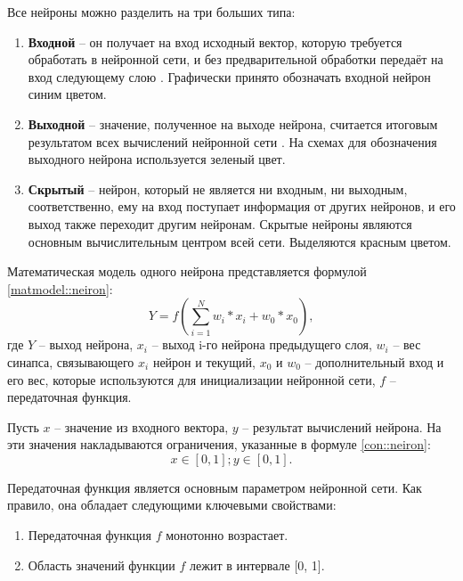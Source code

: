 Все нейроны можно разделить на три больших типа:
\begin{enumerate}
	\item \textbf{Входной} -- он получает на вход исходный вектор, которую требуется обработать в нейронной сети, и без предварительной обработки передаёт на вход следующему слою \cite{ridnet}.
	Графически принято обозначать входной нейрон синим цветом.
	\item \textbf{Выходной} -- значение, полученное на выходе нейрона, считается итоговым результатом всех вычислений нейронной сети \cite{ridnet}.
	На схемах для обозначения выходного нейрона используется зеленый цвет.
	\item \textbf{Скрытый} -- нейрон, который не является ни входным, ни выходным, соответственно, ему на вход поступает информация от других нейронов, и его выход также переходит другим нейронам.
	Скрытые нейроны являются основным вычислительным центром всей сети.
	Выделяются красным цветом.
\end{enumerate}

Математическая модель одного нейрона представляется формулой \ref{matmodel::neiron}:
\begin{equation}
	\label{matmodel::neiron}
	Y = f(\sum_{i = 1}^{N} w_i * x_i + w_0 * x_0),
\end{equation}
где $Y$ -- выход нейрона, $x_i$ -- выход i-го нейрона предыдущего слоя, $w_i$ -- вес синапса, связывающего $x_i$ нейрон и текущий, $x_0$ и $w_0$ -- дополнительный вход и его вес, которые используются для инициализации нейронной сети, $f$ -- передаточная функция.

Пусть $x$ -- значение из входного вектора, $y$ -- результат вычислений нейрона.
На эти значения накладываются ограничения, указанные в формуле \ref{con::neiron}:
\begin{equation}
	\label{con::neiron}
	x \in [0, 1]; y \in [0, 1].
\end{equation}

Передаточная функция является основным параметром нейронной сети.
Как правило, она обладает следующими ключевыми свойствами:
\begin{enumerate}
	\item Передаточная функция $f$ монотонно возрастает.
	\item Область значений функции $f$ лежит в интервале [0, 1].
\end{enumerate}


